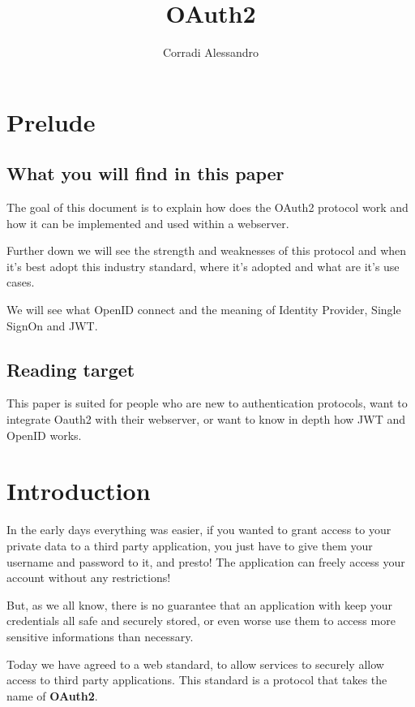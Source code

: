 \documentclass[20pt]{style}
\title{OAuth2}
\author{Corradi Alessandro}
\begin{document}
\maketitle{}
\tableofcontents
\clearpage
{}


\section{Prelude}
\subsection{What you will find in this paper}
The goal of this document is to explain how does the OAuth2 protocol work and
how it can be implemented and used within a webserver.

Further down we will see the strength and weaknesses of this protocol and when
it's best adopt this industry standard, where it's adopted and what are it's use
cases.

We will see what OpenID connect and the meaning of Identity Provider, Single SignOn
and JWT.
\subsection{Reading target}
This paper is suited for people who are new to authentication protocols, want to
integrate Oauth2 with their webserver, or want to know in depth how JWT and
OpenID works.

\section{Introduction}
In the early days everything was easier, if you wanted to grant access to your
private data to a third party application, you just have to give them your
username and password to it, and presto! The application can freely access your
account without any restrictions!

But, as we all know, there is no guarantee that an application with keep your
credentials all safe and securely stored, or even worse use them to access more
sensitive informations than necessary.

Today we have agreed to a web standard, to allow services to securely allow
access to third party applications.
This standard is a protocol that takes the name of \textbf{OAuth2}.
\end{document}
